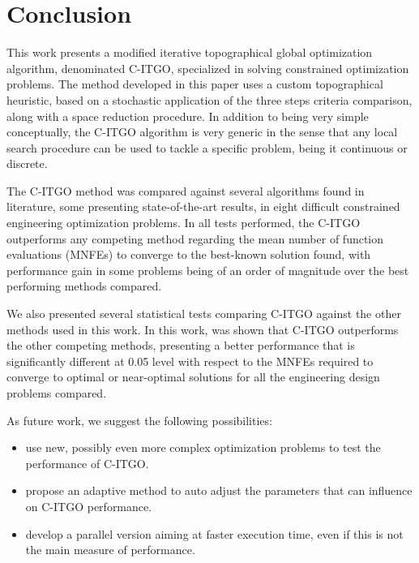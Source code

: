 \section{Conclusion} \label{sec:Conclusion}

This work presents a modified iterative topographical global optimization algorithm, denominated C-ITGO, specialized in solving constrained optimization problems. The method developed in this paper uses a custom topographical heuristic, based on a stochastic application of the three steps criteria comparison, along with a space reduction procedure. In addition to being very simple conceptually, the C-ITGO algorithm is very generic in the sense that any local search procedure can be used to tackle a specific problem, being it continuous or discrete.

The C-ITGO method was compared against several algorithms found in literature, some presenting state-of-the-art results, in eight difficult constrained engineering optimization problems. In all tests performed, the C-ITGO outperforms any competing method regarding the mean number of function evaluations (MNFEs) to converge to the best-known solution found, with performance gain in some problems being of an order of magnitude over the best performing methods compared.

We also presented several statistical tests comparing C-ITGO against the other methods used in this work. In this work, was shown that C-ITGO outperforms the other competing methods, presenting a better performance that is significantly different at 0.05 level with respect to the MNFEs required to converge to optimal or near-optimal solutions for all the engineering design problems compared.

As future work, we suggest the following possibilities:


\begin{itemize}

    \item use new, possibly even more complex optimization problems to test the performance of C-ITGO.

    \item propose an adaptive method to auto adjust the parameters that can influence on C-ITGO performance.

    \item develop a parallel version aiming at faster execution time, even if this is not the main measure of performance.


\end{itemize}